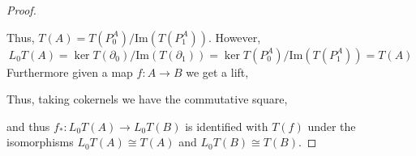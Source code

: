 \documentclass[12pt]{article}
\renewcommand{\Im}[1]{\mathrm{Im}(#1)}
\theoremstyle{remark}
\theoremstyle{definition}
\begin{document}
\begin{proof}
\begin{center}
\begin{tikzcd}
\end{tikzcd}
\end{center}
Thus, $T(A) = T(P^A_0) / \Im{T(P^A_1)}$. However, 
\[ L_0 T(A) = \ker{T(\partial_0)} / \Im{T(\partial_1)} = \ker{T(P^A_0)} / \Im{T(P^A_1)} = T(A) \]
Furthermore given a map $f : A \to B$ we get a lift,
\begin{center}
\end{center}
Thus, taking cokernels we have the commutative square,
\begin{center}
\end{center}
and thus $f_* : L_0 T(A) \to L_0 T(B)$ is identified with $T(f)$ under the isomorphisms $L_0 T(A) \cong T(A)$ and $L_0 T(B) \cong T(B)$. 
\end{proof}
\end{document}
